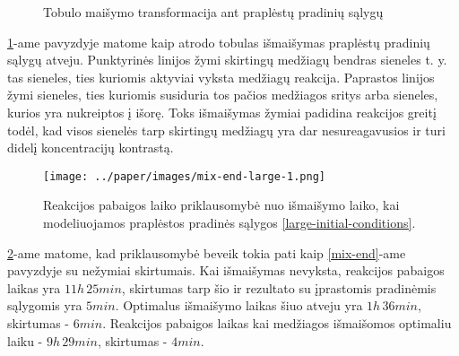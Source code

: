 \begin{figure}[!h]
\caption{Tobulo maišymo transformacija ant praplėstų pradinių sąlygų}
\label{perfect-4x4-mix}
\end{figure}

\ref{perfect-4x4-mix}-ame pavyzdyje matome kaip atrodo tobulas išmaišymas praplėstų pradinių sąlygų atveju. Punktyrinės linijos žymi skirtingų medžiagų bendras sieneles t. y. tas sieneles, ties kuriomis aktyviai vyksta medžiagų reakcija. Paprastos linijos žymi sieneles, ties kuriomis susiduria tos pačios medžiagos sritys arba sieneles, kurios yra nukreiptos į išorę. Toks išmaišymas žymiai padidina reakcijos greitį todėl, kad visos sienelės tarp skirtingų medžiagų yra dar nesureagavusios ir turi didelį koncentracijų kontrastą.

\newpage

\begin{figure}[h!]
    \centering
    \texttt{[image: ../paper/images/mix-end-large-1.png]}

    \caption{Reakcijos pabaigos laiko priklausomybė nuo išmaišymo laiko, kai modeliuojamos praplėstos pradinės sąlygos \eqref{large-initial-conditions}. }

    \label{mix-end-large}
\end{figure}

\ref{mix-end-large}-ame matome, kad priklausomybė beveik tokia pati kaip \ref{mix-end}-ame pavyzdyje su nežymiai skirtumais. Kai išmaišymas nevyksta, reakcijos pabaigos laikas yra $11h\,25min$, skirtumas tarp šio ir rezultato su įprastomis pradinėmis sąlygomis yra $5min$. Optimalus išmaišymo laikas šiuo atveju yra $1h\,36min$, skirtumas - $6min$. Reakcijos pabaigos laikas kai medžiagos išmaišomos optimaliu laiku - $9h\,29min$, skirtumas - $4min$.